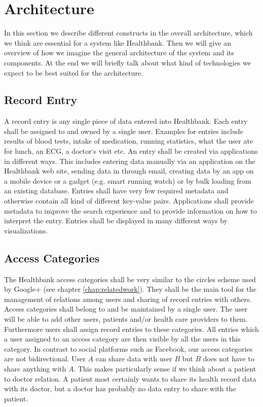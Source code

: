 \section{Architecture} 

In this section we describe different constructs in the overall architecture, which we think are essential for a system like Healthbank. Then we will give an overview of how we imagine the general architecture of the system and its components. At the end we will briefly talk about what kind of technologies we expect to be best suited for the architecture.

\subsection{Record Entry}

A record entry is any single piece of data entered into Healthbank. Each entry shall be assigned to and owned by a single user. Examples for entries include results of blood tests, intake of medication, running statistics, what the user ate for lunch, an ECG, a doctor`s visit etc. An entry shall be created via applications in different ways. This includes entering data manually via an application on the Healthbank web site, sending data in through email, creating data by an app on a mobile device or a gadget (e.g. smart running watch) or by bulk loading from an existing database. Entries shall have very few required metadata and otherwise contain all kind of different key-value pairs. Applications shall provide metadata to improve the search experience and to provide information on how to interpret the entry. Entries shall be displayed in many different ways by visualizations.

\subsection{Access Categories} 

The Healthbank access categories shall be very similar to the circles scheme used by Google+ (see chapter \ref{chap:relatedwork}). They shall be the main tool for the management of relations among users and sharing of record entries with others. 
Access categories shall belong to and be maintained by a single user. The user will be able to add other users, patients and/or health care providers to them. Furthermore users shall assign record entries to these categories. All entries which a user assigned to an access category are then visible by all the users in this category. In contrast to social platforms such as Facebook, our access categories are not bidirectional. User $A$ can share data with user $B$ but $B$ does not have to share
anything with $A$. This makes particularly sense if we think about a patient to doctor relation. A patient most certainly wants to share its health record data with its doctor, but a doctor has probably no data entry to share with the patient.

